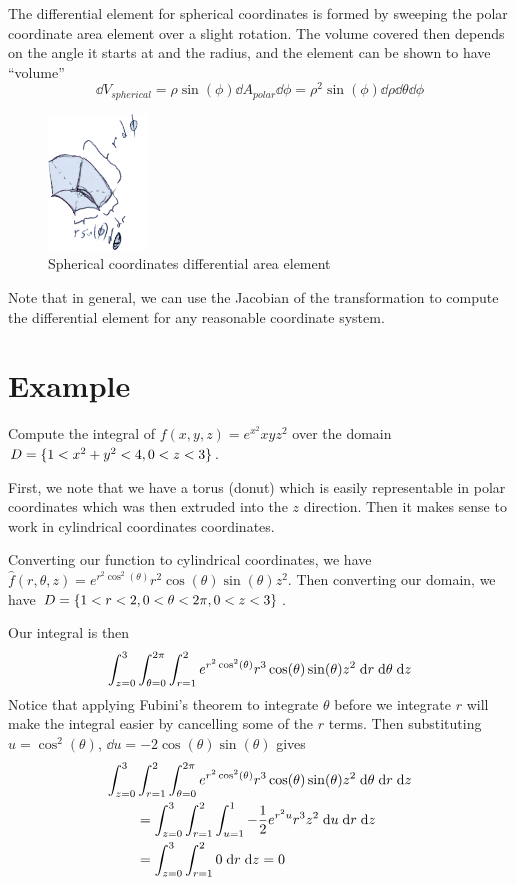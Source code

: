\documentclass[letterpaper,11pt]{article}
\begin{document}
The differential element for spherical coordinates is formed by sweeping the polar coordinate area element over a slight rotation.
The volume covered then depends on the angle it starts at and the radius, and the element can be shown to have ``volume''
$$\dd{V}_{spherical} = \rho \sin(\phi) \dd{A}_{polar} \dd{\phi} = \rho^2 \sin(\phi) \dd{\rho} \dd{\theta} \dd{\phi}$$
\begin{figure}[h]
  \centering \includegraphics[width=100px]{mech222/worksheet_2b_spherical_diff_elem.png}
  \caption{Spherical coordinates differential area element}
\end{figure}

Note that in general, we can use the Jacobian of the transformation to compute the differential element for any reasonable coordinate system.
\section*{Example}
Compute the integral of $f(x, y, z) = e^{x^2} x y z^2$ over the domain $D = \{ 1 < x^2 + y^2 < 4, 0 < z < 3 \}$.

First, we note that we have a torus (donut) which is easily representable in polar coordinates which was then extruded into the $z$ direction.
Then it makes sense to work in cylindrical coordinates coordinates.

Converting our function to cylindrical coordinates, we have $\hat{f}(r, \theta, z) = e^{r^2 \cos^2(\theta)} r^2 \cos(\theta) \sin(\theta) z^2$.
Then converting our domain, we have $D = \{ 1 < r < 2, 0 < \theta < 2 \pi, 0 < z < 3 \}$.

Our integral is then
\begin{equation*}
  \int_{z = 0}^{3} \int_{\theta = 0}^{2 \pi} \int_{r = 1}^{2} e^{r^2 \cos^2(\theta)} r^3 \cos(\theta) \sin(\theta) z^2 \;\mathrm{d}r \;\mathrm{d}\theta \;\mathrm{d}z
\end{equation*}
Notice that applying Fubini's theorem to integrate $\theta$ before we integrate $r$ will make the integral easier by cancelling some of the $r$ terms.
Then substituting $u = \cos^2(\theta)$, $\dd{u} = -2 \cos(\theta) \sin(\theta)$ gives
\begin{align*}
  \int_{z = 0}^{3} & \int_{r = 1}^{2} \int_{\theta = 0}^{2 \pi} e^{r^2 \cos^2(\theta)} r^3 \cos(\theta) \sin(\theta) z^2 \;\mathrm{d}\theta \;\mathrm{d}r \;\mathrm{d}z\\
  & = \int_{z = 0}^{3} \int_{r = 1}^{2} \int_{u = 1}^{1} -\frac{1}{2} e^{r^2 u} r^3 z^2 \;\mathrm{d}u \;\mathrm{d}r \;\mathrm{d}z\\
  & = \int_{z = 0}^{3} \int_{r = 1}^{2} 0 \;\mathrm{d}r \;\mathrm{d}z = 0
\end{align*}
\end{document}
